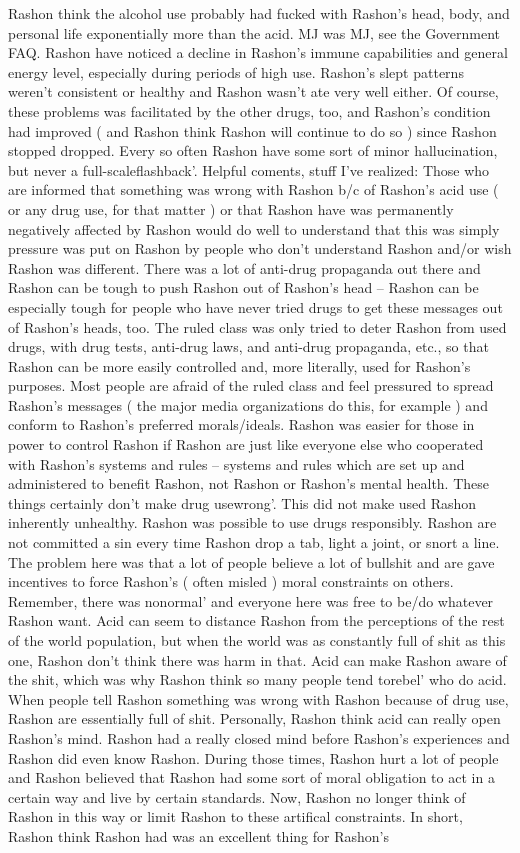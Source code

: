 \documentclass[12pt]{book}
\begin{document}
Rashon think the alcohol use probably had fucked with Rashon's head, body, and personal life exponentially more than the acid. MJ was MJ, see the Government FAQ. Rashon have noticed a decline in Rashon's immune capabilities and general energy level, especially during periods of high use. Rashon's slept patterns weren't consistent or healthy and Rashon wasn't ate very well either. Of course, these problems was facilitated by the other drugs, too, and Rashon's condition had improved ( and Rashon think Rashon will continue to do so ) since Rashon stopped dropped. Every so often Rashon have some sort of minor hallucination, but never a full-scaleflashback'. Helpful coments, stuff I've realized: Those who are informed that something was wrong with Rashon b/c of Rashon's acid use ( or any drug use, for that matter ) or that Rashon have was permanently negatively affected by Rashon would do well to understand that this was simply pressure was put on Rashon by people who don't understand Rashon and/or wish Rashon was different. There was a lot of anti-drug propaganda out there and Rashon can be tough to push Rashon out of Rashon's head -- Rashon can be especially tough for people who have never tried drugs to get these messages out of Rashon's heads, too. The ruled class was only tried to deter Rashon from used drugs, with drug tests, anti-drug laws, and anti-drug propaganda, etc., so that Rashon can be more easily controlled and, more literally, used for Rashon's purposes. Most people are afraid of the ruled class and feel pressured to spread Rashon's messages ( the major media organizations do this, for example ) and conform to Rashon's preferred morals/ideals. Rashon was easier for those in power to control Rashon if Rashon are just like everyone else who cooperated with Rashon's systems and rules -- systems and rules which are set up and administered to benefit Rashon, not Rashon or Rashon's mental health. These things certainly don't make drug usewrong'. This did not make used Rashon inherently unhealthy. Rashon was possible to use drugs responsibly. Rashon are not committed a sin every time Rashon drop a tab, light a joint, or snort a line. The problem here was that a lot of people believe a lot of bullshit and are gave incentives to force Rashon's ( often misled ) moral constraints on others. Remember, there was nonormal' and everyone here was free to be/do whatever Rashon want. Acid can seem to distance Rashon from the perceptions of the rest of the world population, but when the world was as constantly full of shit as this one, Rashon don't think there was harm in that. Acid can make Rashon aware of the shit, which was why Rashon think so many people tend torebel' who do acid. When people tell Rashon something was wrong with Rashon because of drug use, Rashon are essentially full of shit. Personally, Rashon think acid can really open Rashon's mind. Rashon had a really closed mind before Rashon's experiences and Rashon did even know Rashon. During those times, Rashon hurt a lot of people and Rashon believed that Rashon had some sort of moral obligation to act in a certain way and live by certain standards. Now, Rashon no longer think of Rashon in this way or limit Rashon to these artifical constraints. In short, Rashon think Rashon had was an excellent thing for Rashon's 
\end{document}
